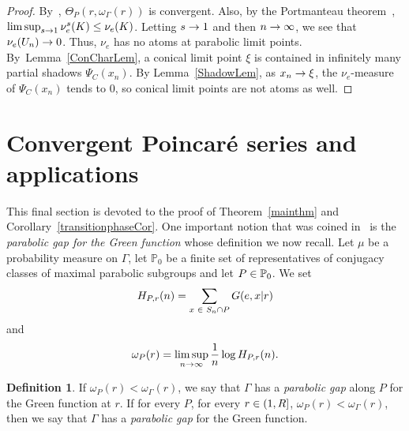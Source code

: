 \documentclass[10pt]{amsart}
\theoremstyle{definition}\newtheorem{defi}[theo]{Definition}\newtheorem{rema}[theo]{Remark}\newtheorem{exam}[theo]{Example}\newtheorem{exem}[theo]{Example}\newtheorem{nota}[theo]{Notation}
\newcommand{\bbP}{\mathbb{P}}
\let\oldin\in
\renewcommand{\in}{\mathchoice{\oldin}{\oldin}{\,\oldin\,}{\,\oldin\,}}
\renewcommand*{\to}{\mathchoice{\longrightarrow}{\rightarrow}{\rightarrow}{\rightarrow}}
\begin{document}
\begin{proof}
By~\cite[Corollary~3.9]{DWY}, $\Theta_P(r,\omega_\Gamma(r))$ is convergent. Also, by the Portmanteau theorem~\cite[Theorem~2.1]{Bill99}, $\limsup_{s\to 1}\nu_e^s(K)\leq \nu_e(K)$. Letting $s\to 1$ and then $n\to\infty$, we see that $\nu_e(U_n)\to 0$. Thus, $\nu_e$ has no atoms at parabolic limit points. By~Lemma~\ref{ConCharLem}, a conical limit point $\xi$ is contained in infinitely many partial shadows $\Psi_{C}(x_n)$. By Lemma~\ref{ShadowLem}, as $x_n\to \xi$, the $\nu_e$-measure of $\Psi_C(x_n)$ tends to $0$, so conical limit points are not atoms as well.
\end{proof}


\section{Convergent Poincaré series and applications}
\label{SectionRHG}

This final section is devoted to the proof of Theorem~\ref{mainthm} and Corollary~\ref{transitionphaseCor}. One important notion that was coined in~\cite{DWY} is the \emph{parabolic gap for the Green function} whose definition we now recall. Let $\mu$ be a probability measure on $\Gamma$, let $\bbP_0$ be a finite set of representatives of conjugacy classes of maximal parabolic subgroups and let $P\in \bbP_0$. We set
\[
H_{P,r}(n)=\sum_{x\in S_n\cap P}G(e,x|r)
\]
and
\[
\omega_P(r)=\limsup_{n\to \infty}\frac{1}{n}\log H_{P,r}(n).
\]
\begin{defi}
If $\omega_P(r)<\omega_\Gamma(r)$, we say that $\Gamma$ has a \emph{parabolic gap} along $P$ for the Green function at $r$. If for every $P$, for every $r\in (1,R]$, $\omega_P(r)<\omega_\Gamma(r)$, then we say that $\Gamma$ has a \emph{parabolic gap} for the Green function.
\end{defi}
\end{document}
